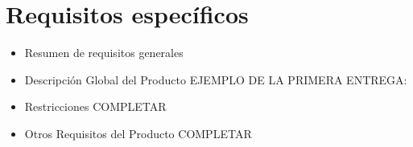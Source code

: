 \chapter{Requisitos específicos}
\begin{itemize}
\item Resumen de requisitos generales
\item Descripción Global del Producto
EJEMPLO DE LA PRIMERA ENTREGA:


\item Restricciones
  COMPLETAR
\item Otros Requisitos del Producto
  COMPLETAR
\end{itemize}

